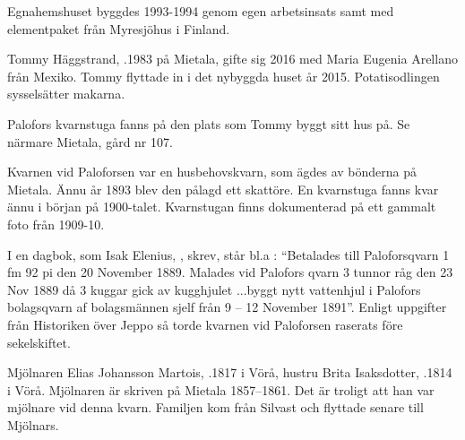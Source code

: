 Egnahemshuset byggdes 1993-1994 genom egen arbetsinsats samt med elementpaket från Myresjöhus i Finland.




Tommy Häggstrand,  .1983 på Mietala, gifte sig 2016 med Maria Eugenia Arellano från Mexiko. Tommy flyttade in i det nybyggda huset år 2015. Potatisodlingen sysselsätter makarna.

Palofors kvarnstuga fanns på den plats som Tommy byggt sitt hus på. Se närmare Mietala, gård nr 107.




Kvarnen vid Paloforsen var en husbehovskvarn, som ägdes av bönderna på 	Mietala. Ännu år 1893 blev den pålagd ett skattöre. En kvarnstuga fanns kvar ännu i början på 1900-talet. Kvarnstugan finns dokumenterad på ett gammalt foto från 1909-10.

I en dagbok, som Isak Elenius, , skrev,  står bl.a : ``Betalades till Paloforsqvarn 1 fm 92 pi den 20 November 1889. Malades vid Palofors qvarn 3 tunnor råg den 23  Nov 1889 då 3 kuggar gick av kugghjulet 	...byggt nytt vattenhjul i Palofors bolagsqvarn af bolagsmännen sjelf från 9 – 12 November 1891''. Enligt uppgifter från Historiken över Jeppo så torde kvarnen vid Paloforsen raserats före sekelskiftet.


Mjölnaren Elias Johansson Martois, .1817 i Vörå, hustru Brita Isaksdotter, .1814 i Vörå. Mjölnaren är skriven på Mietala 1857–1861. Det är troligt att han var mjölnare vid denna kvarn. Familjen kom från Silvast och flyttade senare till Mjölnars.
\begin{jhchildren}
  \item {}
  \item {}
  \item {}
  \item {}
  \item {}
  \item {}
  \item {}
  \item {}
\end{jhchildren}


